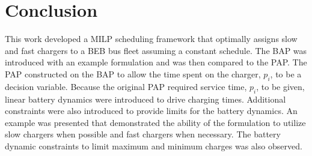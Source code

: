 \documentclass[letterpaper, 10pt, conference]{IEEEtran}
\begin{document}
\section{Conclusion}
\label{sec:conclusion}
This work developed a MILP scheduling framework that optimally assigns slow and fast chargers to a BEB bus fleet assuming a constant schedule. The BAP was introduced with an example formulation and was then compared to the PAP. The PAP constructed on the BAP to allow the time spent on the charger, $p_i$, to be a decision variable. Because the original PAP required service time, $p_i$, to be given, linear battery dynamics were introduced to drive charging times. Additional constraints were also introduced to provide limits for the battery dynamics. An example was presented that demonstrated the ability of the formulation to utilize slow chargers when possible and fast chargers when necessary. The battery dynamic constraints to limit maximum and minimum charges was also observed.




\end{document}
